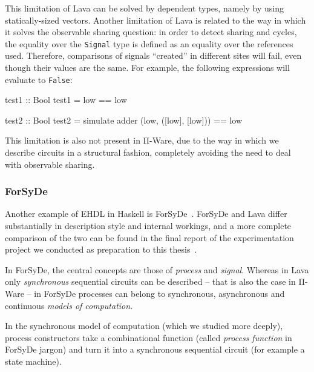             This limitation of Lava can be solved by dependent types, namely by using statically-sized vectors.
            Another limitation of Lava is related to the way in which it solves the observable sharing question:
            in order to detect sharing and cycles, the equality over the \texttt{Signal} type is defined
            as an equality over the references used.
            Therefore, comparisons of signals ``created'' in different sites will fail,
            even though their values are the same.
            For example, the following expressions will evaluate to \texttt{False}:

            \begin{haskellcode}
        test1 :: Bool
        test1 = low == low

        test2 :: Bool
        test2 = simulate adder (low, ([low], [low])) == low
            \end{haskellcode}

            This limitation is also not present in Π-Ware, due to the way in which we describe circuits
            in a structural fashion, completely avoiding the need to deal with observable sharing.


            \subsubsection{ForSyDe}
            Another example of \ac{EHDL} in Haskell is ForSyDe~\cite{forsyde1999}.
            ForSyDe and Lava differ substantially in description style and internal workings,
            and a more complete comparison of the two can be found
            in the final report of the experimentation project we conducted
            as preparation to this thesis~\cite{functional-hardware-survey}.

            In ForSyDe, the central concepts are those of \emph{process} and \emph{signal}.
            Whereas in Lava only \emph{synchronous} sequential circuits can be described -- that is
            also the case in Π-Ware -- in ForSyDe processes can belong to synchronous,
            asynchronous and continuous \emph{models of computation}.

            In the synchronous model of computation (which we studied more deeply),
            process constructors take a combinational function (called \emph{process function} in
            ForSyDe jargon) and turn it into a synchronous sequential circuit
            (for example a state machine).

